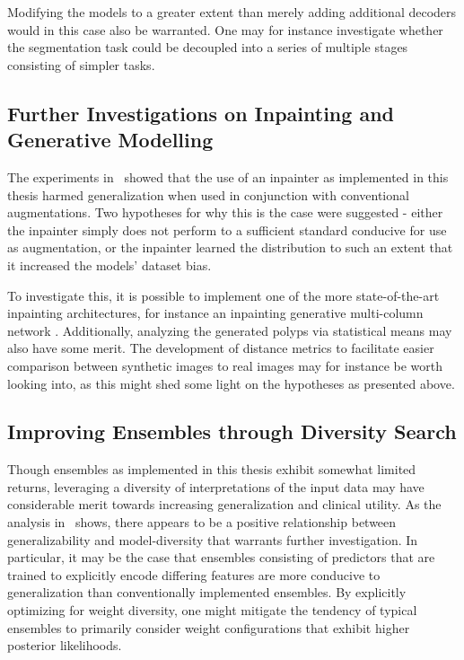         Modifying the models to a greater extent than merely adding additional decoders would in this case also be warranted. One may for instance investigate whether the segmentation task could be decoupled into a series of multiple stages consisting of simpler tasks.
    
  
\subsection{Further Investigations on Inpainting and Generative Modelling}
The experiments in~ showed that the use of an inpainter as implemented in this thesis harmed generalization when used in conjunction with conventional augmentations. Two hypotheses for why this is the case were suggested - either the inpainter simply does not perform to a sufficient standard conducive for use as augmentation, or the inpainter learned the distribution to such an extent that it increased the models' dataset bias. 

To investigate this, it is possible to implement one of the more state-of-the-art inpainting architectures, for instance an inpainting generative multi-column network \cite{inpainter_better}. Additionally, analyzing the generated polyps via statistical means may also have some merit. The development of distance metrics to facilitate easier comparison between synthetic images to real images may for instance be worth looking into, as this might shed some light on the hypotheses as presented above.

    \subsection{Improving Ensembles through Diversity Search}
    Though ensembles as implemented in this thesis exhibit somewhat limited returns, leveraging a diversity of interpretations of the input data may have considerable merit towards increasing generalization and clinical utility. As the analysis in~ shows, there appears to be a positive relationship between generalizability and model-diversity that warrants further investigation. In particular, it may be the case that ensembles consisting of predictors that are trained to explicitly encode differing features are more conducive to generalization than conventionally implemented ensembles. By explicitly optimizing for weight diversity, one might mitigate the tendency of typical ensembles to primarily consider weight configurations that exhibit higher posterior likelihoods. 
    
